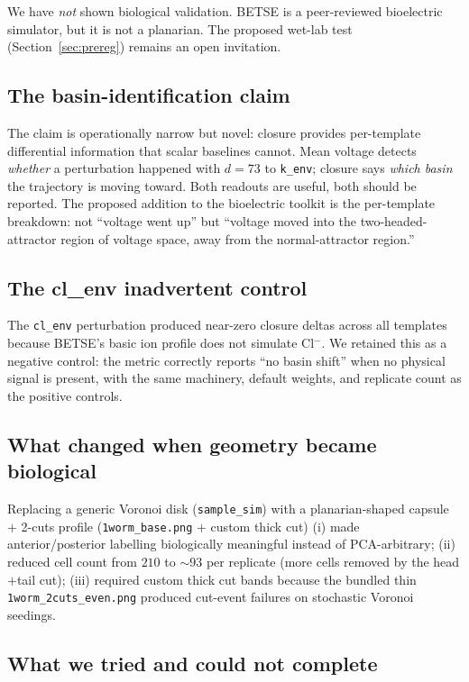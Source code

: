 \documentclass[11pt,a4paper]{article}
\begin{document}
We have \emph{not} shown biological validation. BETSE is a peer-reviewed bioelectric simulator, but it is not a planarian. The proposed wet-lab test (Section~\ref{sec:prereg}) remains an open invitation.

\subsection{The basin-identification claim}

The claim is operationally narrow but novel: closure provides per-template differential information that scalar baselines cannot. Mean voltage detects \emph{whether} a perturbation happened with $d=73$ to \texttt{k\_env}; closure says \emph{which basin} the trajectory is moving toward. Both readouts are useful, both should be reported. The proposed addition to the bioelectric toolkit is the per-template breakdown: not ``voltage went up'' but ``voltage moved into the two-headed-attractor region of voltage space, away from the normal-attractor region.''

\subsection{The cl\_env inadvertent control}

The \texttt{cl\_env} perturbation produced near-zero closure deltas across all templates because BETSE's basic ion profile does not simulate Cl$^{-}$. We retained this as a negative control: the metric correctly reports ``no basin shift'' when no physical signal is present, with the same machinery, default weights, and replicate count as the positive controls.

\subsection{What changed when geometry became biological}

Replacing a generic Voronoi disk (\texttt{sample\_sim}) with a planarian-shaped capsule $+$ 2-cuts profile (\texttt{1worm\_base.png} $+$ custom thick cut) (i) made anterior/posterior labelling biologically meaningful instead of PCA-arbitrary; (ii) reduced cell count from $210$ to $\sim$$93$ per replicate (more cells removed by the head$+$tail cut); (iii) required custom thick cut bands because the bundled thin \texttt{1worm\_2cuts\_even.png} produced cut-event failures on stochastic Voronoi seedings.

\subsection{What we tried and could not complete}
\end{document}

